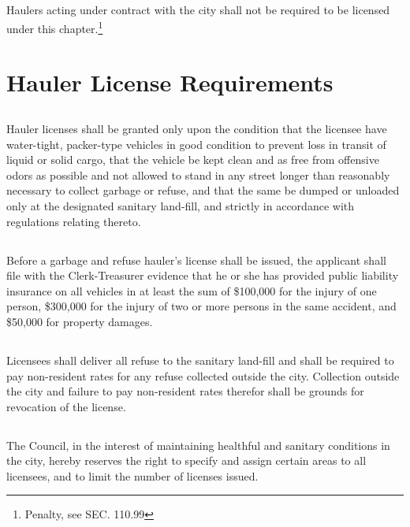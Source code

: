 \subsection{}
Haulers acting under contract with the city shall not be required to be licensed under this chapter.\footnote{Penalty, see SEC. 110.99}

\section{Hauler License Requirements}
\subsection{}
Hauler licenses shall be granted only upon the condition that the licensee have water-tight, packer-type vehicles in good condition to prevent loss in transit of liquid or solid cargo, that the vehicle be kept clean and as free from offensive odors as possible and not allowed to stand in any street longer than reasonably necessary to collect garbage or refuse, and that the same be dumped or unloaded only at the designated sanitary land-fill, and strictly in accordance with regulations relating thereto.
\subsection{}
Before a garbage and refuse hauler’s license shall be issued, the applicant shall file with the Clerk-Treasurer evidence that he or she has provided public liability insurance on all vehicles in at least the sum of \$100,000 for the injury of one person, \$300,000 for the injury of two or more persons in the same accident, and \$50,000 for property damages.
\subsection{}
Licensees shall deliver all refuse to the sanitary land-fill and shall be required to pay non-resident rates for any refuse collected outside the city.  Collection outside the city and failure to pay non-resident rates therefor shall be grounds for revocation of the license.
\subsection{}
The Council, in the interest of maintaining healthful and sanitary conditions in the city, hereby reserves the right to specify and assign certain areas to all licensees, and to limit the number of licenses issued.
